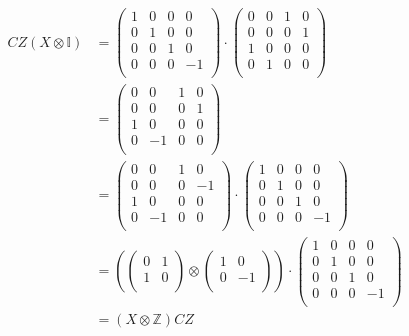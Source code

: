 \begin{align} \label{eqn_APP: CZ commute X}
    CZ(X\otimes\mathbb{I}) & = 
    \begin{pmatrix}
        1 & 0 & 0 & 0 \\
        0 & 1 & 0 & 0 \\
        0 & 0 & 1 & 0 \\
        0 & 0 & 0 & -1 \\
    \end{pmatrix} \cdot
    \begin{pmatrix}
        0 & 0 & 1 & 0 \\
        0 & 0 & 0 & 1 \\
        1 & 0 & 0 & 0 \\
        0 & 1 & 0 & 0 \\
    \end{pmatrix}
    \\ & =
    \begin{pmatrix}
        0 & 0 & 1 & 0 \\
        0 & 0 & 0 & 1 \\
        1 & 0 & 0 & 0 \\
        0 & -1 & 0 & 0 \\
    \end{pmatrix}
    \\ & = 
    \begin{pmatrix}
        0 & 0 & 1 & 0 \\
        0 & 0 & 0 & -1 \\
        1 & 0 & 0 & 0 \\
        0 & -1 & 0 & 0 \\
    \end{pmatrix} \cdot
    \begin{pmatrix}
        1 & 0 & 0 & 0 \\
        0 & 1 & 0 & 0 \\
        0 & 0 & 1 & 0 \\
        0 & 0 & 0 & -1 \\
    \end{pmatrix} 
    \\ & = 
    \left(
    \begin{pmatrix}
        0 & 1 \\
        1 & 0 \\
    \end{pmatrix}
    \otimes
    \begin{pmatrix}
        1 & 0 \\
        0 & -1 \\
    \end{pmatrix}  \right) \cdot 
    \begin{pmatrix}
        1 & 0 & 0 & 0 \\
        0 & 1 & 0 & 0 \\
        0 & 0 & 1 & 0 \\
        0 & 0 & 0 & -1 \\
    \end{pmatrix} 
    \\ & = 
    (X\otimes\mathbb{Z})CZ
\end{align}

